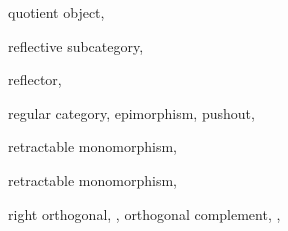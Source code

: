 \documentclass [12pt,oneside]{book}%
\theoremstyle{captionstyle}  %
\begin{document}
\begin{theindex}
    \indexspace

    \item quotient
    \subitem object, 

    \indexspace

    \item reflective subcategory, 
    \item reflector, 
    \item regular
    \subitem category, 
    \subitem epimorphism, 
    \subitem pushout, 
    \item retractable
    \subitem monomorphism, 
    \item retractable monomorphism, 
    \item right
    \subitem orthogonal, , 
    \subitem orthogonal complement, , 

    \indexspace


\end{theindex}
\end{document}
